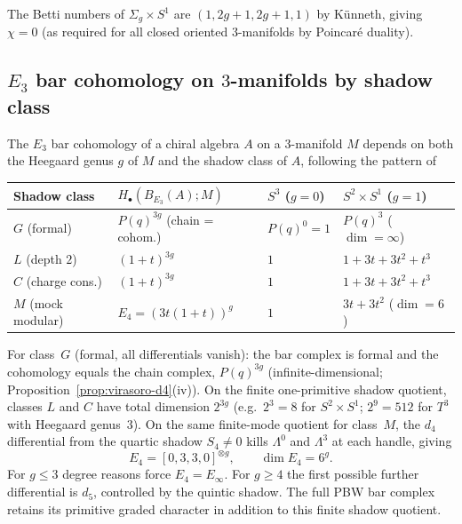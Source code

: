 \noindent The Betti numbers of $\Sigma_g \times S^1$ are $(1, 2g+1, 2g+1, 1)$ by K\"unneth, giving $\chi = 0$ (as required for all closed oriented $3$-manifolds by Poincar\'e duality).

\subsection{\texorpdfstring{$E_3$}{E-3} bar cohomology on \texorpdfstring{$3$}{3}-manifolds by shadow class}
\label{subsec:e3-bar-3folds}

The $E_3$ bar cohomology of a chiral algebra $A$ on a $3$-manifold $M$ depends on both the Heegaard genus $g$ of $M$ and the shadow class of $A$, following the pattern of

\begin{center}
\small
\renewcommand{\arraystretch}{1.3}
\begin{tabular}{llll}
 \toprule
 \textbf{Shadow class} & \textbf{$H_\bullet(B_{E_3}(A); M)$} & \textbf{$S^3$ ($g = 0$)} & \textbf{$S^2 \times S^1$ ($g = 1$)} \\
 \midrule
 $G$ (formal) & $P(q)^{3g}$ (chain = cohom.) & $P(q)^0 = 1$ & $P(q)^3$ ($\dim = \infty$) \\
 $L$ (depth $2$) & $(1+t)^{3g}$ & $1$ & $1 + 3t + 3t^2 + t^3$ \\
 $C$ (charge cons.) & $(1+t)^{3g}$ & $1$ & $1 + 3t + 3t^2 + t^3$ \\
 $M$ (mock modular) & $E_4=(3t(1+t))^g$ & $1$ & $3t + 3t^2$ ($\dim = 6$) \\
 \bottomrule
\end{tabular}
\end{center}

\noindent For class~$G$ (formal, all differentials vanish): the bar complex is formal and the cohomology equals the chain complex, $P(q)^{3g}$ (infinite-dimensional; Proposition~\ref{prop:virasoro-d4}(iv)). On the finite one-primitive shadow quotient, classes $L$ and $C$ have total dimension $2^{3g}$ (e.g.\ $2^3 = 8$ for $S^2 \times S^1$; $2^9 = 512$ for $T^3$ with Heegaard genus~$3$). On the same finite-mode quotient for class~$M$, the $d_4$ differential from the quartic shadow $S_4 \neq 0$ kills $\Lambda^0$ and $\Lambda^3$ at each handle, giving
\[
 E_4=[0,3,3,0]^{\otimes g},
 \qquad
 \dim E_4=6^g .
\]
For \(g\leq 3\) degree reasons force \(E_4=E_\infty\). For \(g\geq4\) the first possible further differential is \(d_5\), controlled by the quintic shadow. The full PBW bar complex retains its primitive graded character in addition to this finite shadow quotient.

